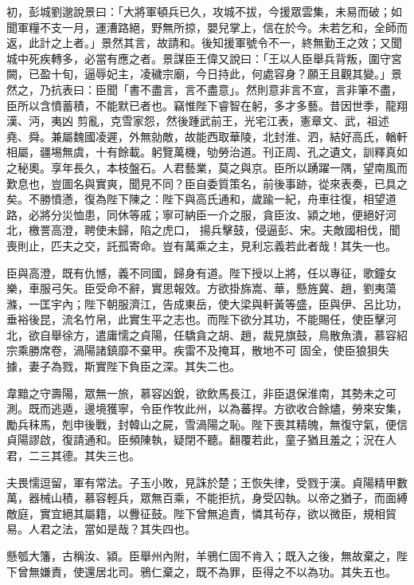 \begin{pinyinscope}
 初，彭城劉邈說景曰：「大將軍頓兵已久，攻城不拔，今援眾雲集，未易而破；如聞軍糧不支一月，運漕路絕，野無所掠，嬰兒掌上，信在於今。未若乞和，全師而返，此計之上者。」景然其言，故請和。後知援軍號令不一，終無勤王之效；又聞城中死疾轉多，必當有應之者。景謀臣王偉又說曰：「王以人臣舉兵背叛，圍守宮闕，已盈十旬，逼辱妃主，凌穢宗廟，今日持此，何處容身？願王且觀其變。」景然之，乃抗表曰：臣聞「書不盡言，言不盡意」。然則意非言不宣，言非筆不盡，臣所以含憤蓄積，不能默已者也。竊惟陛下睿智在躬，多才多藝。昔因世季，龍翔漢、沔，夷凶
 剪亂，克雪家怨，然後踵武前王，光宅江表，憲章文、武，祖述堯、舜。兼屬魏國凌遲，外無勍敵，故能西取華陵，北封淮、泗，結好高氏，輶軒相屬，疆埸無虞，十有餘載。躬覽萬機，劬勞治道。刊正周、孔之遺文，訓釋真如之秘奧。享年長久，本枝盤石。人君藝業，莫之與京。臣所以踴躍一隅，望南風而歎息也，豈圖名與實爽，聞見不同？臣自委質策名，前後事跡，從來表奏，已具之矣。不勝憤懣，復為陛下陳之：陛下與高氏通和，歲踰一紀，舟車往復，相望道路，必將分災恤患，同休等戚；寧可納臣一介之服，貪臣汝、潁之地，便絕好河北，檄詈高澄，聘使未歸，陷之虎口，
 揚兵擊鼓，侵逼彭、宋。夫敵國相伐，聞喪則止，匹夫之交，託孤寄命。豈有萬乘之主，見利忘義若此者哉！其失一也。



 臣與高澄，既有仇憾，義不同國，歸身有道。陛下授以上將，任以專征，歌鐘女樂，車服弓矢。臣受命不辭，實思報效。方欲掛旆嵩、華，懸旌冀、趙，劉夷蕩滌，一匡宇內；陛下朝服濟江，告成東岳，使大梁與軒黃等盛，臣與伊、呂比功，垂裕後昆，流名竹帛，此實生平之志也。而陛下欲分其功，不能賜任，使臣擊河北，欲自舉徐方，遣庸懦之貞陽，任驕貪之胡、趙，裁見旗鼓，鳥散魚潰，慕容紹宗乘勝席卷，渦陽諸鎮靡不棄甲。疾雷不及掩耳，散地不可
 固全，使臣狼狽失據，妻子為戮，斯實陛下負臣之深。其失二也。



 韋黯之守壽陽，眾無一旅，慕容凶銳，欲飲馬長江，非臣退保淮南，其勢未之可測。既而逃遁，邊境獲寧，令臣作牧此州，以為蕃捍。方欲收合餘燼，勞來安集，勵兵秣馬，剋申後戰，封韓山之屍，雪渦陽之恥。陛下喪其精魄，無復守氣，便信貞陽謬啟，復請通和。臣頻陳執，疑閉不聽。翻覆若此，童子猶且羞之；況在人君，二三其德。其失三也。



 夫畏懦逗留，軍有常法。子玉小敗，見誅於楚；王恢失律，受戮于漢。貞陽精甲數萬，器械山積，慕容輕兵，眾無百乘，不能拒抗，身受囚執。以帝之猶子，而面縛
 敵庭，實宜絕其屬籍，以釁征鼓。陛下曾無追責，憐其茍存，欲以微臣，規相貿易。人君之法，當如是哉？其失四也。



 懸瓠大籓，古稱汝、潁。臣舉州內附，羊鴉仁固不肯入；既入之後，無故棄之，陛下曾無嫌責，使還居北司。鴉仁棄之，既不為罪，臣得之不以為功。其失五也。




\end{pinyinscope}
